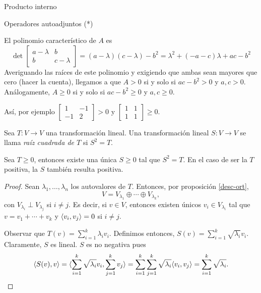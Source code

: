 \begin{chapter}{Producto interno}
\begin{section}{Operadores autoadjuntos (*)}
\begin{ejemplo*}
            El polinomio característico de $A$ es 
            $$
            \det \begin{bmatrix} 
            a-\lambda &b\\b&c -\lambda
            \end{bmatrix} =
            (a-\lambda)(c -\lambda) - b^2 = \lambda^2 +(-a-c)\lambda + ac - b^2
            $$
            Averiguando las raíces de este polinomio y exigiendo que ambas sean mayores que cero (hacer la cuenta), llegamos a que $A>0$ si y solo si $ac - b^2 > 0$ y $a,c >0$. Análogamente, $A\ge 0$ si y solo si $ac - b^2 \ge 0$ y $a,c \ge0$. 
            
            Así, por ejemplo $\begin{bmatrix}
            1&-1\\-1&2
            \end{bmatrix} > 0$  y  $\begin{bmatrix}
            1&1\\1&1
            \end{bmatrix} \ge 0$.	
        \end{ejemplo*}
        
        
        \begin{definicion}
            Sea $T: V \to V$ una transformación lineal. Una transformación  lineal $S: V \to V$  se llama \textit{raíz cuadrada de $T$} si $S^2 = T$.
        \end{definicion}
        
        
        
        \begin{teorema}
            Sea $T \ge 0$, entonces existe una única $S \ge 0$ tal que $S^2 = T$. En el caso de ser la $T$ positiva,  la $S$ también resulta positiva.
        \end{teorema}
        \begin{proof}
            Sean  $\lambda_1,\ldots,\lambda_n$ los autovalores de $T$. Entonces, por proposición \ref{desc-ort}, 
                $$
            V = V_{\lambda_1}\oplus \cdots \oplus V_{\lambda_k},
            $$
            con  $V_{\lambda_i} \perp V_{\lambda_j}$  si $i \ne j$. Es decir, si $v \in V$, entonces existen únicos $v_i \in V_{\lambda_i}$ tal que $v = v_1+\cdots+v_k$ y $\langle v_i,v_j \rangle = 0$ si $i \ne j$.
            
             Observar que $T(v)= \sum_{i=1}^k {\lambda_i}v_i$. Definimos entonces, $S(v) = \sum_{i=1}^k \sqrt{\lambda_i} v_i$.  Claramente, $S$ es lineal. $S$ es no negativa pues
             $$
             \langle S(v),v \rangle =  \langle \sum_{i=1}^k \sqrt{\lambda_i} v_i,\sum_{j=1}^k  v_j \rangle  = 
             \sum_{i=1}^k\sum_{j=1}^k \sqrt{\lambda_i}\langle  v_i,  v_j \rangle  = \sum_{i=1}^k \sqrt{\lambda_i}.
             $$
             

\end{proof}
\end{section}
\end{chapter}
